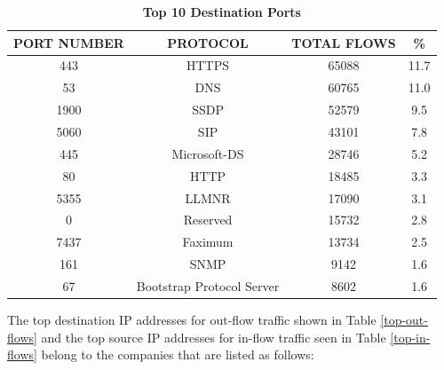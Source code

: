 \documentclass[journal]{IEEE/IEEEtran}
\begin{document}
\begin{table}[ht]
\centering
\caption{\textbf{Top 10 Destination Ports}}
\label{top-dest-ports}
\begin{tabular}{|c|c|c|c|}
\hline
\textbf{PORT NUMBER}			& \textbf{PROTOCOL}			& \textbf{TOTAL FLOWS}		& \textbf{\%} 	 \\ \hline
    443							& HTTPS						&  65088					& 11.7  	     \\ \hline
    53							& DNS						&  60765        			& 11.0			 \\ \hline
    1900						& SSDP						&  52579					& 9.5			 \\ \hline
    5060						& SIP						&  43101          			& 7.8   	     \\ \hline
    445							& Microsoft-DS				&  28746           			& 5.2        	 \\ \hline
    80							& HTTP						&  18485					& 3.3         	 \\ \hline
    5355						& LLMNR						&  17090    		        & 3.1    	     \\ \hline
    0							& Reserved					&  15732		            & 2.8       	 \\ \hline
    7437						& Faximum					&  13734        		    & 2.5         	 \\ \hline
    161							& SNMP						&  9142        			    & 1.6         	 \\ \hline
    67							& Bootstrap Protocol Server	&  8602        			    & 1.6         	 \\ \hline
\end{tabular}
\end{table}

The top destination IP addresses for out-flow traffic shown in Table \ref{top-out-flows} and the top source IP addresses for in-flow traffic seen in Table \ref{top-in-flows} belong to the companies that are listed as follows:
\end{document}
